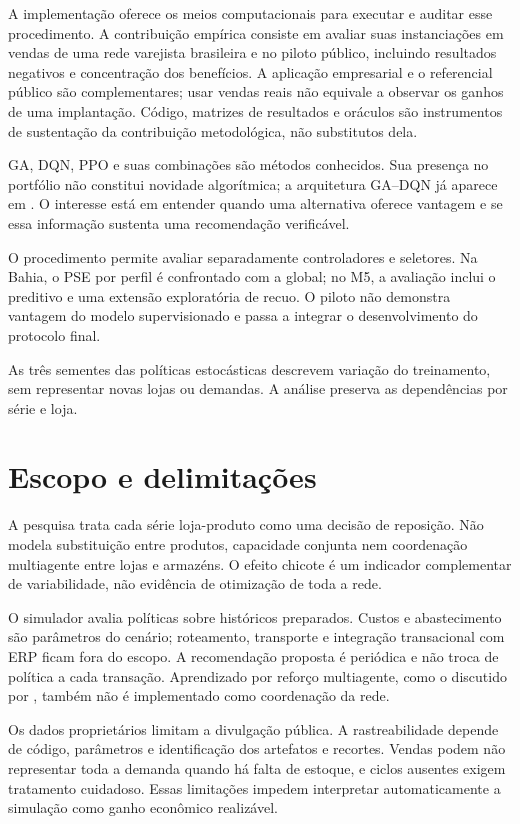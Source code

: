 A implementação oferece os meios computacionais para executar e auditar esse procedimento. A contribuição empírica consiste em avaliar suas instanciações em vendas de uma rede varejista brasileira e no piloto público, incluindo resultados negativos e concentração dos benefícios. A aplicação empresarial e o referencial público são complementares; usar vendas reais não equivale a observar os ganhos de uma implantação. Código, matrizes de resultados e oráculos são instrumentos de sustentação da contribuição metodológica, não substitutos dela.

GA, DQN, PPO e suas combinações são métodos conhecidos. Sua presença no portfólio não constitui novidade algorítmica; a arquitetura GA--DQN já aparece em \citet{Zabraoui2025GaDQN}. O interesse está em entender quando uma alternativa oferece vantagem e se essa informação sustenta uma recomendação verificável.

O procedimento permite avaliar separadamente controladores e seletores. Na Bahia, o PSE por perfil é confrontado com a global; no M5, a avaliação inclui o preditivo e uma extensão exploratória de recuo. O piloto não demonstra vantagem do modelo supervisionado e passa a integrar o desenvolvimento do protocolo final.

As três sementes das políticas estocásticas descrevem variação do treinamento, sem representar novas lojas ou demandas. A análise preserva as dependências por série e loja.

\section{Escopo e delimitações}
\label{sec:delimitacoes}

A pesquisa trata cada série loja-produto como uma decisão de reposição. Não modela substituição entre produtos, capacidade conjunta nem coordenação multiagente entre lojas e armazéns. O efeito chicote é um indicador complementar de variabilidade, não evidência de otimização de toda a rede.

O simulador avalia políticas sobre históricos preparados. Custos e abastecimento são parâmetros do cenário; roteamento, transporte e integração transacional com ERP ficam fora do escopo. A recomendação proposta é periódica e não troca de política a cada transação. Aprendizado por reforço multiagente, como o discutido por \citet{Liu2024HAPPO}, também não é implementado como coordenação da rede.

Os dados proprietários limitam a divulgação pública. A rastreabilidade depende de código, parâmetros e identificação dos artefatos e recortes. Vendas podem não representar toda a demanda quando há falta de estoque, e ciclos ausentes exigem tratamento cuidadoso. Essas limitações impedem interpretar automaticamente a simulação como ganho econômico realizável.

